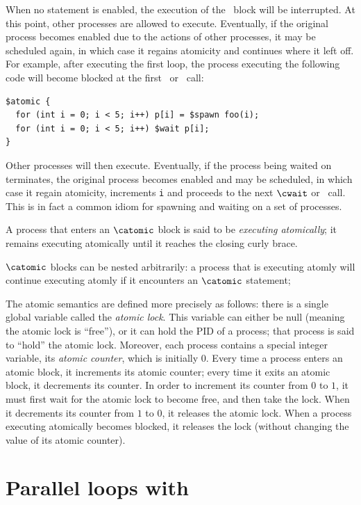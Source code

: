 When no statement is enabled, the execution of the \catomic\ block
will be interrupted.  At this point, other processes are allowed to
execute.  Eventually, if the original process becomes enabled due to
the actions of other processes, it may be scheduled again, in which
case it regains atomicity and continues where it left off.  For
example, after executing the first loop, the process executing the
following code will become blocked at the first \cwait\ or \cwaitall\ call:
 \begin{verbatim}  
$atomic {
  for (int i = 0; i < 5; i++) p[i] = $spawn foo(i);
  for (int i = 0; i < 5; i++) $wait p[i];
}
\end{verbatim}
Other processes will then execute. Eventually, if the process being
waited on terminates, the original process becomes enabled and may be
scheduled, in which case it regain atomicity, increments \texttt{i}
and proceeds to the next $\cwait$ or \cwaitall\ call.  This is in fact a common
idiom for spawning and waiting on a set of processes.

A process that enters an $\catomic$ block is said to be
\emph{executing atomically}; it remains executing atomically until it
reaches the closing curly brace.

$\catomic$ blocks can be nested arbitrarily: 
a process that is executing atomly will continue executing atomly 
if it encounters an $\catomic$ statement;

The atomic semantics are defined more precisely as follows: there is a
single global variable called the \emph{atomic lock}. This variable
can either be null (meaning the atomic lock is ``free''), or it can
hold the PID of a process; that process is said to ``hold'' the atomic
lock.  Moreover, each process contains a special integer variable, its
\emph{atomic counter}, which is initially 0.  Every time a process
enters an atomic block, it increments its atomic counter; every time
it exits an atomic block, it decrements its counter.  In order to
increment its counter from $0$ to $1$, it must first wait for the
atomic lock to become free, and then take the lock.  When it
decrements its counter from $1$ to $0$, it releases the atomic lock.
When a process executing atomically becomes blocked, it releases the
lock (without changing the value of its atomic counter).

\section{Parallel loops with \cparfor}
\label{sec:parfor}

